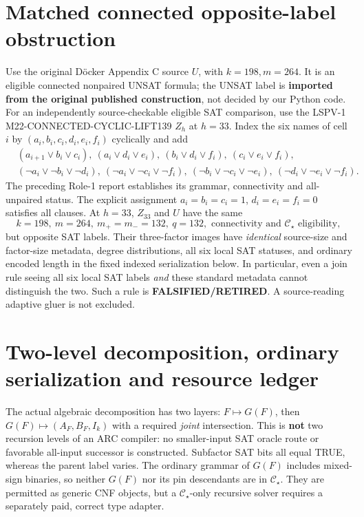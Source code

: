 \documentclass[11pt]{article}
\newcommand{\CS}{\mathcal C_{\star}}
\begin{document}
\section{Matched connected opposite-label obstruction}
Use the original D\"ocker Appendix C source $U$, with $k=198,m=264$. It is an eligible connected nonpaired UNSAT formula; the UNSAT label is \textbf{imported from the original published construction}, not decided by our Python code. For an independently source-checkable eligible SAT comparison, use the LSPV-1 M22-CONNECTED-CYCLIC-LIFT139 $Z_h$ at $h=33$. Index the six names of cell $i$ by $(a_i,b_i,c_i,d_i,e_i,f_i)$ cyclically and add
\[
\begin{aligned}
&(a_{i+1}\vee b_i\vee c_i),\
(a_i\vee d_i\vee e_i),\
(b_i\vee d_i\vee f_i),\
(c_i\vee e_i\vee f_i),\\
&(\neg a_i\vee\neg b_i\vee\neg d_i),\
(\neg a_i\vee\neg c_i\vee\neg f_i),\
(\neg b_i\vee\neg c_i\vee\neg e_i),\
(\neg d_i\vee\neg e_i\vee\neg f_i).
\end{aligned}
\]
The preceding Role-1 report establishes its grammar, connectivity and all-unpaired status. The explicit assignment $a_i=b_i=c_i=1$, $d_i=e_i=f_i=0$ satisfies all clauses. At $h=33$, $Z_{33}$ and $U$ have the same
\[
\boxed{k=198,\ m=264,\ m_+=m_-=132,\ q=132,\text{ connectivity and }\CS\text{ eligibility},}
\]
but opposite SAT labels. Their three-factor images have \emph{identical} source-size and factor-size metadata, degree distributions, all six local SAT statuses, and ordinary encoded length in the fixed indexed serialization below. In particular, even a join rule seeing all six local SAT labels \emph{and} these standard metadata cannot distinguish the two. Such a rule is \textbf{FALSIFIED/RETIRED}. A source-reading adaptive gluer is not excluded.

\section{Two-level decomposition, ordinary serialization and resource ledger}
The actual algebraic decomposition has two layers: $F\mapsto G(F)$, then $G(F)\mapsto(A_F,B_F,I_k)$ with a required \emph{joint} intersection. This is \textbf{not} two recursion levels of an ARC compiler: no smaller-input SAT oracle route or favorable all-input successor is constructed. Subfactor SAT bits all equal TRUE, whereas the parent label varies. The ordinary grammar of $G(F)$ includes mixed-sign binaries, so neither $G(F)$ nor its pin descendants are in $\CS$. They are permitted as generic CNF objects, but a $\CS$-only recursive solver requires a separately paid, correct type adapter.
\end{document}

